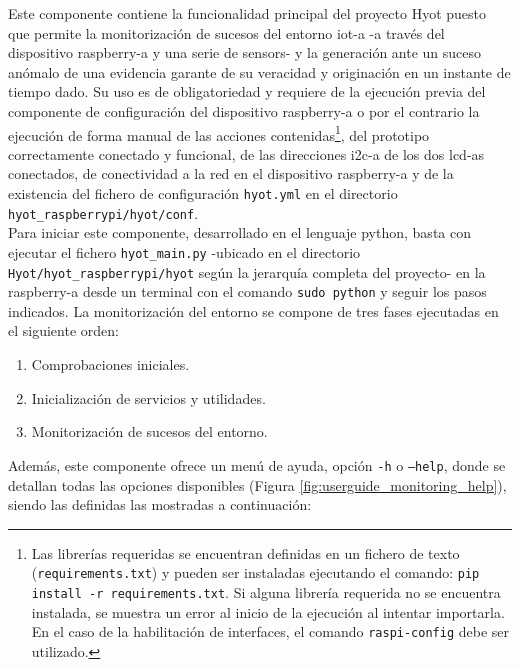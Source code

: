 \documentclass[12pt,a4paper, twoside]{report}
\begin{document}
	 Este componente contiene la funcionalidad principal del proyecto Hyot puesto que permite la monitorización de sucesos del entorno \gls{iot-a} -a través del dispositivo \gls{raspberry-a} y una serie de \glspl{sensor}- y la generación ante un suceso anómalo de una evidencia garante de su veracidad y originación en un instante de tiempo dado. Su uso es de obligatoriedad y requiere de la ejecución previa del componente de configuración del dispositivo \gls{raspberry-a} o por el contrario la ejecución de forma manual de las acciones contenidas\footnote{Las librerías requeridas se encuentran definidas en un fichero de texto (\texttt{requirements.txt}) y pueden ser instaladas ejecutando el comando: \texttt{pip install -r requirements.txt}. Si alguna librería requerida no se encuentra instalada, se muestra un error al inicio de la ejecución al intentar importarla. En el caso de la habilitación de interfaces, el comando \texttt{raspi-config} debe ser utilizado.}, del prototipo correctamente conectado y funcional, de las direcciones \gls{i2c-a} de los dos \glspl{lcd-a} conectados, de conectividad a la red en el dispositivo \gls{raspberry-a} y de la existencia del fichero de configuración \texttt{hyot.yml} en el directorio \texttt{hyot\_raspberrypi/hyot/conf}. \\
	 
	Para iniciar este componente, desarrollado en el lenguaje \gls{python}, basta con ejecutar el fichero \texttt{hyot\_main.py} -ubicado en el directorio \texttt{Hyot/hyot\_raspberrypi/hyot} según la jerarquía completa del proyecto- en la \gls{raspberry-a} desde un terminal con el comando \texttt{sudo python} y seguir los pasos indicados. La monitorización del entorno se compone de tres fases ejecutadas en el siguiente orden:
	
	\begin{enumerate}
		\item Comprobaciones iniciales.
		\item Inicialización de servicios y utilidades.
		\item Monitorización de sucesos del entorno.
	\end{enumerate}
	
	Además, este componente ofrece un menú de ayuda, opción \texttt{-h} o \texttt{--help}, donde se detallan todas las opciones disponibles (Figura \ref{fig:userguide_monitoring_help}), siendo las definidas las mostradas a continuación:
	
\end{document}
